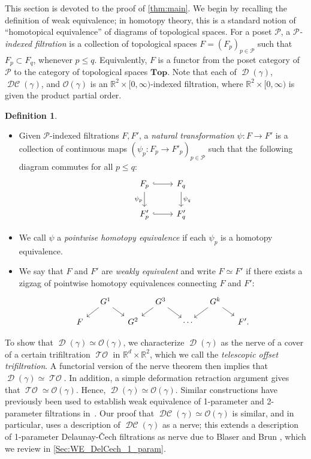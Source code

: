 \documentclass[11pt]{amsart}
\newcommand{\R}{\mathbb{R}} %
\DeclareMathOperator{\Del}{\mathcal{D}}
\DeclareMathOperator{\TelOffset}{\mathcal{TO}}
\DeclareMathOperator{\DelCech}{\mathcal{DC}}
\newcommand{\Top}{\textbf{Top}}
\newcommand{\deff}{\emph}
\newcommand{\Offset}[0]{\mathcal{O}}
\theoremstyle{plain}
\theoremstyle{definition}
\newtheorem{definition}[theorem]{Definition}
\theoremstyle{remark}
\begin{document}
%
This section is devoted to the proof of \cref{thm:main}.  We begin by recalling the definition of weak equivalence; in homotopy theory, this is a standard notion of ``homotopical equivalence'' of diagrams of topological spaces.  
For a poset $\mathcal{P}$, a \deff{$\mathcal{P}$-indexed filtration} is a collection of topological spaces $F=(F_p)_{p \in \mathcal{P}}$ 
such that $F_p \subset F_q$, whenever $p \leq q$.  
Equivalently, $F$ is a functor from the poset category of $\mathcal{P}$ to the category of topological spaces $\Top$.   Note that each of $\Del(\gamma)$, $\DelCech(\gamma)$, and $\Offset(\gamma)$ is an $\R^2\times [0,\infty)$-indexed filtration, where $\R^2\times [0,\infty)$ is given the product partial order.  
%
\begin{definition}\label{def:top_equiv}\mbox{}
\begin{itemize}
\item[(i)] Given  $\mathcal{P}$-indexed filtrations $F,F'$, a \deff{natural transformation} $\psi\colon F\to F'$ is a collection 
 of continuous maps $(\psi_p:F_p \to F'_p)_{p \in \mathcal{P}}$ such that the following diagram commutes for all $p\leq q$:
 \[
\begin{tikzcd}
    F_p \arrow[r, hook] \arrow[d,"\psi_p",swap] & F_q \arrow[d,"\psi_q"] \\
    F'_p \arrow[r, hook] & F'_q
\end{tikzcd} \]
\item[(ii)] We call $\psi$ a \deff{pointwise homotopy equivalence} if each $\psi_p$ is a homotopy equivalence.  
\item[(iii)] We say that $F$ and $F'$ are \deff{weakly equivalent} and write $F\simeq F'$ if there exists a zigzag of pointwise homotopy equivalences connecting $F$ and $F'$:
\[
\begin{tikzcd}[row sep=small, column sep=small]
 & G^1 \arrow[dr] \arrow[dl] & & G^3  \arrow[dr] \arrow[dl] & & G^k  \arrow[dr] \arrow[dl] & \\
F  & & G^2 & & \cdots & & F'.
\end{tikzcd}
\]
\end{itemize}
\end{definition}
%
To show that  $\Del(\gamma)\simeq \Offset(\gamma)$, we characterize $\Del(\gamma)$ as the nerve of a cover of a certain trifiltration $\TelOffset$ in $\R^{d}\times\R^{2}$, which we call the \emph{telescopic offset trifiltration}.   A functorial version of the nerve theorem \cite{bauerUnifiedViewFunctorial2023} then implies that $\Del(\gamma)\simeq \TelOffset$.  In addition, a simple deformation retraction argument gives that $\TelOffset\simeq \Offset(\gamma)$.  Hence, $\Del(\gamma)\simeq \Offset(\gamma)$.  Similar constructions have previously been used to establish weak equivalence of 1-parameter and 2-parameter filtrations in~\cite{cavanna2015geometric, corbet2023computing}.  Our proof that $\DelCech(\gamma)\simeq \Offset(\gamma)$ is similar, and in particular, uses a description of $\DelCech(\gamma)$ as a nerve; this extends a description of 1-parameter Delaunay-\v Cech filtrations as nerve due to Blaser and Brun \cite{blaser2022relative}, which we review in \cref{Sec:WE_DelCech_1_param}.
\end{document}
